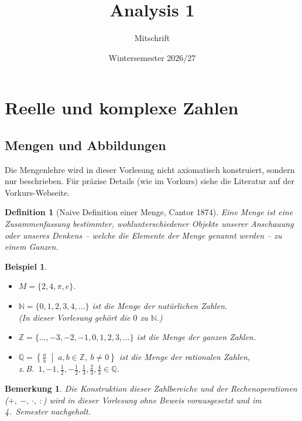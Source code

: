 \documentclass[a4paper]{article}
\title{Analysis 1}
\author{Mitschrift}
\date{Wintersemester 2026/27}
\theoremstyle{kurzskript}
\newtheorem{definition}[satz]{Definition}
\newtheorem{beispiel}[satz]{Beispiel}
\newtheorem*{bem}{Bemerkung}
\newcommand{\N}{\mathbb{N}}
\newcommand{\Z}{\mathbb{Z}}
\newcommand{\Q}{\mathbb{Q}}
\begin{document}
\maketitle
\tableofcontents
\newpage

\section{Reelle und komplexe Zahlen}

\subsection{Mengen und Abbildungen}

Die Mengenlehre wird in dieser Vorlesung nicht axiomatisch konstruiert, sondern nur beschrieben. Für präzise Details (wie im Vorkurs) siehe die Literatur auf der Vorkurs-Webseite.

\begin{definition}[Naive Definition einer Menge, Cantor 1874]
Eine \emph{Menge} ist eine Zusammenfassung bestimmter, wohlunterschiedener Objekte unserer Anschauung oder unseres Denkens -- welche die \emph{Elemente} der Menge genannt werden -- zu einem Ganzen.
\end{definition}

\begin{beispiel}
\leavevmode
\begin{itemize}
  \item $M = \{2, 4, \pi, e\}$.
  \item $\N = \{0, 1, 2, 3, 4, \dots\}$ ist die Menge der \emph{natürlichen Zahlen}. \\
        (In dieser Vorlesung gehört die $0$ zu $\N$.)
  \item $\Z = \{\dots, -3, -2, -1, 0, 1, 2, 3, \dots\}$ ist die Menge der \emph{ganzen Zahlen}.
  \item $\Q = \left\{\tfrac{a}{b} \;\middle|\; a, b \in \Z,\ b \neq 0\right\}$ ist die Menge der \emph{rationalen Zahlen}, \\
        z.\,B.\ $1, -1, \tfrac12, -\tfrac12, \tfrac13, \tfrac23, \tfrac43 \in \Q$.
\end{itemize}
\end{beispiel}

\begin{bem}
Die Konstruktion dieser Zahlbereiche und der Rechenoperationen ($+,\ -,\ \cdot,\ :$) wird in dieser Vorlesung ohne Beweis vorausgesetzt und im 4.~Semester nachgeholt.
\end{bem}
\end{document}
